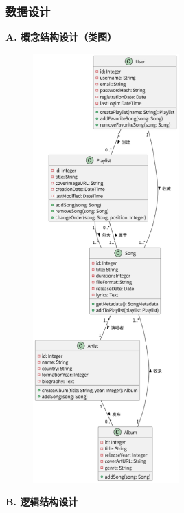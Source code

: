 \documentclass{base}
\begin{document}
\subsubsection{数据设计}

\textbf{A. 概念结构设计（类图）}

\begin{figure}[H]
    \centering
    \includegraphics[width=0.5\textwidth]{images/5-14.png}
\end{figure}

\textbf{B. 逻辑结构设计}
\end{document}
